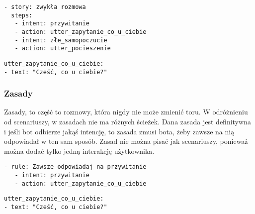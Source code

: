 \documentclass{article}
\begin{document}
\begin{lstlisting}[caption=Przykładowa historia]
- story: zwykła rozmowa
  steps:
   - intent: przywitanie
   - action: utter_zapytanie_co_u_ciebie
   - intent: złe_samopoczucie
   - action: utter_pocieszenie
\end{lstlisting}

\begin{lstlisting}[caption= Jak zdefiniowane są odpowiedzi]
utter_zapytanie_co_u_ciebie:
- text: "Cześć, co u ciebie?"
\end{lstlisting}

\subsubsection{Zasady}
Zasady, to część to rozmowy, która nigdy nie może zmienić toru. W odróżnieniu
od scenariuszy, w zasadach nie ma różnych ścieżek. Dana zasada jest definitywna
i jeśli bot odbierze jakąś intencję, to zasada zmusi bota, żeby zawsze na nią
odpowiadał w ten sam sposób. Zasad nie można pisać jak scenariuszy, ponieważ
można dodać tylko jedną interakcję użytkownika.

\begin{lstlisting}[caption=Przykładowa zasada]
- rule: Zawsze odpowiadaj na przywitanie
   - intent: przywitanie
   - action: utter_zapytanie_co_u_ciebie
\end{lstlisting}

\begin{lstlisting}[caption= Jak zdefiniowane są odpowiedzi]
utter_zapytanie_co_u_ciebie:
- text: "Cześć, co u ciebie?"
\end{lstlisting}
\end{document}
